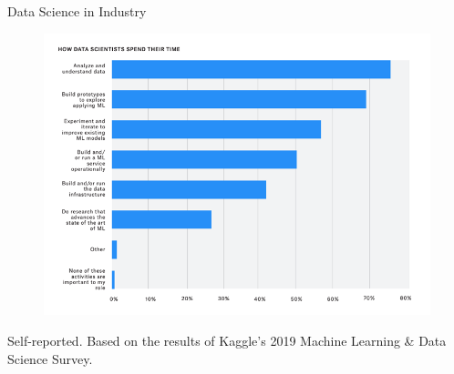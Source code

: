 \documentclass[aspectratio=169]{../latex_main/tntbeamer}  %
\begin{document}
    \begin{frame}{Data Science in Industry}
        \begin{figure}
            \centering
            \vspace{-2em}
            \includegraphics[scale= .65]{bild5}
        \end{figure}
        Self-reported. Based on the results of Kaggle’s 2019 Machine Learning \& Data Science Survey.
    \end{frame}
    
\end{document}
